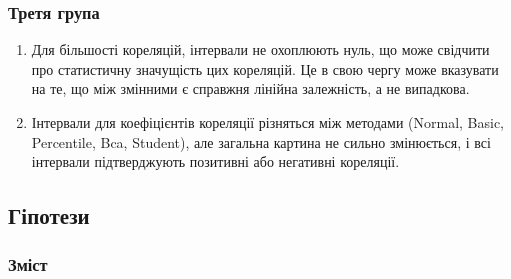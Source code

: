 \documentclass{beamer}
\begin{document}
\begin{frame}
  \frametitle{Третя група}

  \begin{enumerate}
    \item Для більшості кореляцій, інтервали не охоплюють нуль, що може свідчити про
    статистичну значущість цих кореляцій. Це в свою чергу може вказувати на те,
    що між змінними є справжня лінійна залежність, а не випадкова.
    \item Інтервали для коефіцієнтів кореляції різняться між методами 
    (Normal, Basic, Percentile, Bca, Student), але загальна картина не сильно 
    змінюється, і всі інтервали підтверджують позитивні або негативні кореляції. 
    
  
  \end{enumerate}
\end{frame}


\begin{frame}
  \section{Гіпотези}

  \frametitle{Зміст}
  \tableofcontents[currentsection]
\end{frame}
\end{document}
